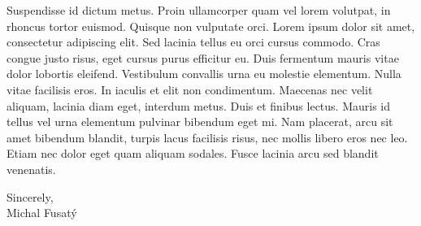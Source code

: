 \documentclass[12pt]{article}
\begin{document}
Suspendisse id dictum metus. Proin ullamcorper quam vel lorem volutpat, in rhoncus tortor euismod. Quisque non vulputate orci. Lorem ipsum dolor sit amet, consectetur adipiscing elit. Sed lacinia tellus eu orci cursus commodo. Cras congue justo risus, eget cursus purus efficitur eu. Duis fermentum mauris vitae dolor lobortis eleifend. Vestibulum convallis urna eu molestie elementum. Nulla vitae facilisis eros. In iaculis et elit non condimentum. Maecenas nec velit aliquam, lacinia diam eget, interdum metus. Duis et finibus lectus. Mauris id tellus vel urna elementum pulvinar bibendum eget mi. Nam placerat, arcu sit amet bibendum blandit, turpis lacus facilisis risus, nec mollis libero eros nec leo. Etiam nec dolor eget quam aliquam sodales. Fusce lacinia arcu sed blandit venenatis.

Sincerely, \\
Michal Fusatý
\end{document}
